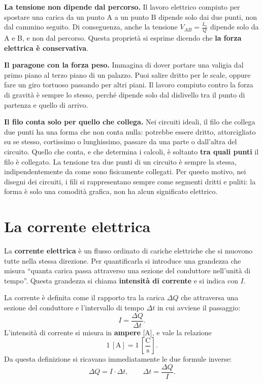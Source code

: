 \begin{concetto}
\textbf{La tensione non dipende dal percorso.} Il lavoro elettrico compiuto per spostare una carica da un punto A a un punto B dipende solo dai due punti, non dal cammino seguito. Di conseguenza, anche la tensione \(V_{AB} = \frac{L_e}{Q}\) dipende solo da A e B, e non dal percorso. Questa proprietà si esprime dicendo che \textbf{la forza elettrica è conservativa}.
\end{concetto}

\begin{esempio}
\textbf{Il paragone con la forza peso.} Immagina di dover portare una valigia dal primo piano al terzo piano di un palazzo. Puoi salire dritto per le scale, oppure fare un giro tortuoso passando per altri piani. Il lavoro compiuto contro la forza di gravità è sempre lo stesso, perché dipende solo dal dislivello tra il punto di partenza e quello di arrivo.
\end{esempio}

\begin{concetto}
\textbf{Il filo conta solo per quello che collega.} Nei circuiti ideali, il filo che collega due punti ha una forma che non conta nulla: potrebbe essere dritto, attorcigliato su se stesso, cortissimo o lunghissimo, passare da una parte o dall'altra del circuito. Quello che conta, e che determina i calcoli, è soltanto \textbf{tra quali punti} il filo è collegato. La tensione tra due punti di un circuito è sempre la stessa, indipendentemente da come sono fisicamente collegati. Per questo motivo, nei disegni dei circuiti, i fili si rappresentano sempre come segmenti dritti e puliti: la forma è solo una comodità grafica, non ha alcun significato elettrico.
\end{concetto}

\section{La corrente elettrica}


La \textbf{corrente elettrica} è un flusso ordinato di cariche elettriche che si muovono tutte nella stessa direzione. Per quantificarla si introduce una grandezza che misura ``quanta carica passa attraverso una sezione del conduttore nell'unità di tempo''. Questa grandezza si chiama \textbf{intensità di corrente} e si indica con \(I\).

La corrente è definita come il rapporto tra la carica \(\Delta Q\) che attraversa una sezione del conduttore e l'intervallo di tempo \(\Delta t\) in cui avviene il passaggio:
\[
I = \frac{\Delta Q}{\Delta t}.
\]
L'intensità di corrente si misura in \textbf{ampere} [\(\text{A}\)], e vale la relazione
\[
1\,[\text{A}] = 1\,\left[\frac{\text{C}}{\text{s}}\right].
\]
Da questa definizione si ricavano immediatamente le due formule inverse:
\[
\Delta Q = I \cdot \Delta t, \qquad \Delta t = \frac{\Delta Q}{I}.
\]

